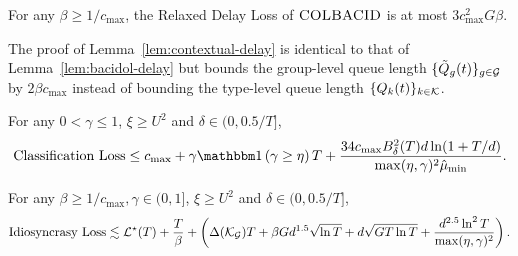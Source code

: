 \begin{lemma}\label{lem:contextual-delay}
For any $\beta \geq 1 / c_{\max}$, the Relaxed Delay Loss of $\textsc{COLBACID}$ is at most $3c^2_{\max}G\beta$. 
\end{lemma}
The proof of Lemma~\ref{lem:contextual-delay} is identical to that of Lemma~\ref{lem:bacidol-delay} but bounds the group-level queue length $\{\tilde{Q}_g(t)\}_{g \in \mathcal{G}}$ by $2\beta c_{\max}$ instead of bounding the type-level queue length $\{Q_k(t)\}_{k \in \mathcal{K}}$.
\begin{lemma}\label{lem:contextual-class}
For any $0 < \gamma \leq 1$, $\xi \geq U^2$ and $\delta \in (0,0.5/T]$,
\[
\text{Classification Loss} \leq c_{\max} + \gamma \indic{\gamma \geq \eta} T + \frac{34c_{\max}B_{\delta}^2(T)d\ln(1+T/d)}{\max(\eta,\gamma)^2\hat{\mu}_{\min}}.
\]
\end{lemma}
\begin{lemma}\label{lem:contextual-idio}
For any $\beta \geq 1 / c_{\max}, \gamma \in (0,1]$, $\xi \geq U^2$ and $\delta \in (0,0.5/T]$,  \[\text{Idiosyncrasy Loss} \lesssim
\mathcal{L}^\star(T) + \frac{T}{\beta} +\left(\Delta(\mathcal{K}_{\mathcal{G}})T+\beta Gd^{1.5}\sqrt{\ln T}+d\sqrt{GT \ln T}+\frac{d^{2.5}\ln^{2} T}{\max(\eta,\gamma)^2}\right).\]
\end{lemma}

